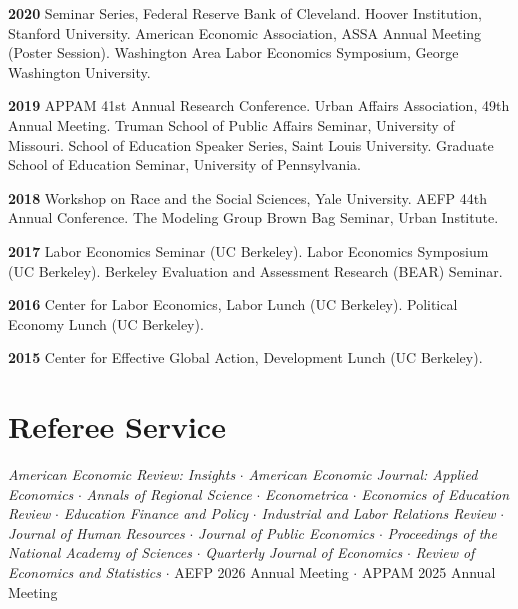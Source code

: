 \documentclass[11pt,letterpaper]{article}
\begin{document}
\medskip

\textbf{2020} \quad Seminar Series, Federal Reserve Bank of Cleveland. Hoover Institution, Stanford University. American Economic Association, ASSA Annual Meeting (Poster Session). Washington Area Labor Economics Symposium, George Washington University.

\medskip

\textbf{2019} \quad APPAM 41st Annual Research Conference. Urban Affairs Association, 49th Annual Meeting. Truman School of Public Affairs Seminar, University of Missouri. School of Education Speaker Series, Saint Louis University. Graduate School of Education Seminar, University of Pennsylvania.

\medskip

\textbf{2018} \quad Workshop on Race and the Social Sciences, Yale University. AEFP 44th Annual Conference. The Modeling Group Brown Bag Seminar, Urban Institute.

\medskip

\textbf{2017} \quad Labor Economics Seminar (UC Berkeley). Labor Economics Symposium (UC Berkeley). Berkeley Evaluation and Assessment Research (BEAR) Seminar.

\medskip

\textbf{2016} \quad Center for Labor Economics, Labor Lunch (UC Berkeley). Political Economy Lunch (UC Berkeley).

\medskip

\textbf{2015} \quad Center for Effective Global Action, Development Lunch (UC Berkeley).

\section*{Referee Service}

\textit{American Economic Review: Insights} $\cdot$ \textit{American Economic Journal: Applied Economics} $\cdot$ \textit{Annals of Regional Science} $\cdot$ \textit{Econometrica} $\cdot$ \textit{Economics of Education Review} $\cdot$ \textit{Education Finance and Policy} $\cdot$ \textit{Industrial and Labor Relations Review} $\cdot$ \textit{Journal of Human Resources} $\cdot$ \textit{Journal of Public Economics} $\cdot$ \textit{Proceedings of the National Academy of Sciences} $\cdot$ \textit{Quarterly Journal of Economics} $\cdot$ \textit{Review of Economics and Statistics} $\cdot$ AEFP 2026 Annual Meeting $\cdot$ APPAM 2025 Annual Meeting
\end{document}
